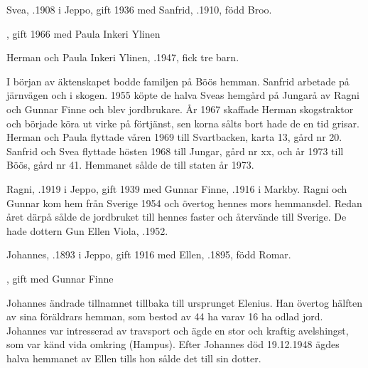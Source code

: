 Svea, .1908 i Jeppo, gift 1936 med Sanfrid, .1910, född Broo.
\begin{jhchildren}
  \item {}
  \item {}
  \item {}, gift 1966 med Paula Inkeri Ylinen
\end{jhchildren}

Herman och Paula Inkeri Ylinen, .1947, fick tre barn.
\begin{jhchildren}
  \item {}
  \item {}
  \item {}
\end{jhchildren}

I början av äktenskapet bodde familjen på Böös hemman. Sanfrid arbetade på järnvägen och i skogen. 1955 köpte de halva Sveas hemgård på Jungarå av Ragni och Gunnar Finne och blev jordbrukare. År 1967 skaffade Herman skogstraktor och började köra ut virke på förtjänst, sen korna sålts bort hade de en tid grisar. Herman och 	Paula flyttade våren 1969 till Svartbacken, karta 13, gård nr 20. Sanfrid och Svea flyttade hösten 1968 till Jungar, gård nr xx, och år 1973 till Böös, gård nr 41. Hemmanet sålde de till staten år 1973.


Ragni, .1919 i Jeppo, gift 1939 med Gunnar Finne, .1916 i Markby. Ragni och Gunnar kom hem från Sverige 1954 och övertog hennes mors hemmansdel. Redan året därpå sålde de jordbruket till  hennes faster och återvände till Sverige. De hade dottern Gun Ellen Viola, .1952.


Johannes, .1893 i Jeppo, gift 1916 med Ellen, .1895, född Romar.
\begin{jhchildren}
  \item {}
  \item {}, gift med Gunnar Finne
\end{jhchildren}
Johannes ändrade tillnamnet tillbaka till ursprunget Elenius. Han övertog hälften av sina föräldrars hemman, som bestod av 44 ha varav 16 ha odlad jord. Johannes var intresserad av travsport och ägde en stor och kraftig avelshingst, som var känd vida omkring (Hampus). Efter Johannes död 19.12.1948 ägdes halva hemmanet av Ellen tills hon sålde det till sin dotter.


